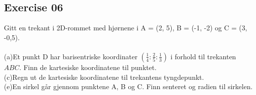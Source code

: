 \documentclass[12pt, a4paper]{article}
\begin{document}
\newpage\quad
\subsection*{Exercise 06}
Gitt en trekant i 2D-rommet med hjørnene i A = (2, 5),
	B = (-1, -2) og C = (3, -0,5).\\\\
	(a)\quad Et punkt D har barisentriske koordinater $
		\left(\frac{1}{4}:\frac{2}{5}:\frac{1}{3}\right)
	$ i forhold til trekanten $ABC$. Finn de kartesiske 
	koordinatene til punktet.
			\begin{equation}
				\tag*{}
			\end{equation}
	(c)\quad Regn ut de kartesiske koordinatene til trekantens
	tyngdepunkt.
			\begin{equation}
				\tag*{}
			\end{equation}
	(e)\quad En sirkel går gjennom punktene A, B og C.
	Finn senteret og radien til sirkelen.
			\begin{equation}
				\tag*{}
			\end{equation}
\end{document}
